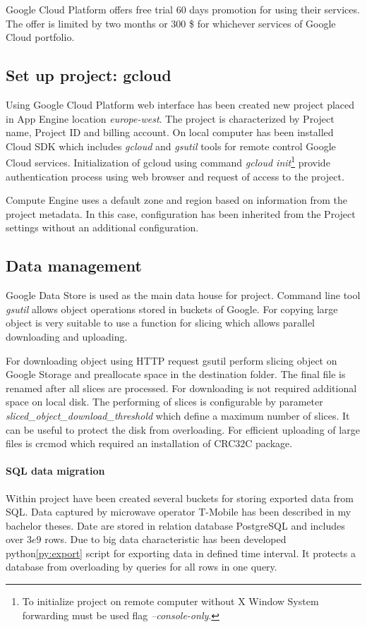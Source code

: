 \documentclass[a4paper,12pt,oneside]{report}
\begin{document}
Google Cloud Platform offers free trial 60 days promotion for using their services. The offer is limited by two
 months or 300 \$ for whichever services of Google Cloud portfolio.
        \subsection{Set up project: gcloud}
Using Google Cloud Platform web interface has been created new project placed in App Engine 
location \textit{europe-west}. The project is characterized by Project name, Project ID and billing account.
On local computer has been installed Cloud SDK which includes \textit{gcloud} 
and \textit{gsutil} tools for remote control Google Cloud services.
Initialization of gcloud using command \emph{gcloud init}\footnote{To initialize project on remote computer 
without X Window System forwarding must be used flag \emph{--console-only}.} provide authentication process using web browser 
and request of access to the project.

Compute Engine uses a default zone and region based on information from the project metadata. In this case, 
configuration has been inherited from the Project settings without an additional configuration.


\subsection{Data management}
        Google Data Store is used as the main data house for project. Command line tool \textit{gsutil} 
        allows object operations stored in buckets of Google. For copying large object is very suitable to use 
        a function for slicing which allows parallel 
        downloading and uploading.
        
For downloading object using HTTP request gsutil perform slicing object on Google Storage  and preallocate 
space in the destination folder. The final file is renamed after all slices are processed. For downloading 
is not required additional space on local disk. 
The performing of slices is configurable by parameter \textit{sliced\_object\_download\_threshold} which 
define a maximum number of slices. It can be 
useful to protect the disk from overloading. For efficient uploading of large files is crcmod which required 
an installation  of CRC32C package. 

\paragraph{SQL data migration} Within project have been created several buckets for storing exported 
data from SQL. Data captured by microwave operator T-Mobile has been described in my bachelor theses\cite{bp_krejci}. 
Date are stored in relation database 
PostgreSQL and includes over $3e9$ rows. Due to big data characteristic has been developed python\ref{py:export} 
script for exporting data in defined time 
interval. It protects a database from overloading by queries for all rows in one query. 
\end{document}
